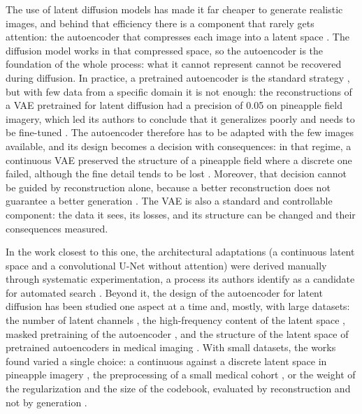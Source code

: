The use of latent diffusion models has made it far cheaper to generate realistic images, and behind that efficiency there is a component that rarely gets attention: the autoencoder that compresses each image into a latent space \cite{Rombach2022}. The diffusion model works in that compressed space, so the autoencoder is the foundation of the whole process: what it cannot represent cannot be recovered during diffusion. In practice, a pretrained autoencoder is the standard strategy \cite{Zheng2025}, but with few data from a specific domain it is not enough: the reconstructions of a VAE pretrained for latent diffusion had a precision of 0.05 on pineapple field imagery, which led its authors to conclude that it generalizes poorly and needs to be fine-tuned \cite{XieLi2025VAE}. The autoencoder therefore has to be adapted with the few images available, and its design becomes a decision with consequences: in that regime, a continuous VAE preserved the structure of a pineapple field where a discrete one failed, although the fine detail tends to be lost \cite{Gonzalez2026}. Moreover, that decision cannot be guided by reconstruction alone, because a better reconstruction does not guarantee a better generation \cite{Yao2025,Zhong2026}. The VAE is also a standard and controllable component: the data it sees, its losses, and its structure can be changed and their consequences measured.

In the work closest to this one, the architectural adaptations (a continuous latent space and a convolutional U-Net without attention) were derived manually through systematic experimentation, a process its authors identify as a candidate for automated search \cite{Gonzalez2026}. Beyond it, the design of the autoencoder for latent diffusion has been studied one aspect at a time and, mostly, with large datasets: the number of latent channels \cite{Yao2025,Sehwag2025}, the high-frequency content of the latent space \cite{Skorokhodov2025}, masked pretraining of the autoencoder \cite{Chen2025,Lee2025LDMAE}, and the structure of the latent space of pretrained autoencoders in medical imaging \cite{Dombrowski2026}. With small datasets, the works found varied a single choice: a continuous against a discrete latent space in pineapple imagery \cite{Gonzalez2026}, the preprocessing of a small medical cohort \cite{Fallah2026}, or the weight of the regularization and the size of the codebook, evaluated by reconstruction and not by generation \cite{XieLi2025VAE}.

